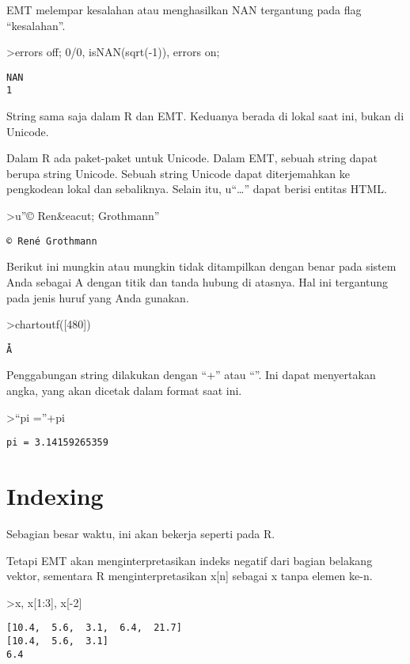 \documentclass[
]{book}
\begin{document}
EMT melempar kesalahan atau menghasilkan NAN tergantung pada flag ``kesalahan''.

\textgreater errors off; 0/0, isNAN(sqrt(-1)), errors on;

\begin{verbatim}
NAN
1
\end{verbatim}

String sama saja dalam R dan EMT. Keduanya berada di lokal saat ini, bukan di Unicode.

Dalam R ada paket-paket untuk Unicode. Dalam EMT, sebuah string dapat berupa string Unicode. Sebuah string Unicode dapat diterjemahkan ke pengkodean lokal dan sebaliknya. Selain itu, u``\ldots'' dapat berisi entitas HTML.

\textgreater u''© Ren\&eacut; Grothmann''

\begin{verbatim}
© René Grothmann
\end{verbatim}

Berikut ini mungkin atau mungkin tidak ditampilkan dengan benar pada sistem Anda sebagai A dengan titik dan tanda hubung di atasnya. Hal ini tergantung pada jenis huruf yang Anda gunakan.

\textgreater chartoutf({[}480{]})

\begin{verbatim}
Ǡ
\end{verbatim}

Penggabungan string dilakukan dengan ``+'' atau ``\textbar{}''. Ini dapat menyertakan angka, yang akan dicetak dalam format saat ini.

\textgreater{}``pi =''+pi

\begin{verbatim}
pi = 3.14159265359
\end{verbatim}

\section{Indexing}\label{indexing}

Sebagian besar waktu, ini akan bekerja seperti pada R.

Tetapi EMT akan menginterpretasikan indeks negatif dari bagian belakang vektor, sementara R menginterpretasikan x{[}n{]} sebagai x tanpa elemen ke-n.

\textgreater x, x{[}1:3{]}, x{[}-2{]}

\begin{verbatim}
[10.4,  5.6,  3.1,  6.4,  21.7]
[10.4,  5.6,  3.1]
6.4
\end{verbatim}
\end{document}
